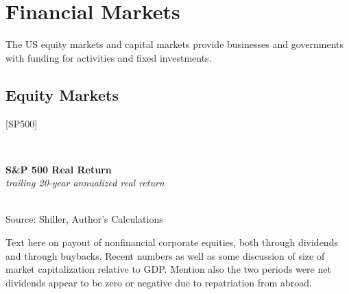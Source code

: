 \documentclass{report}
\makeatletter
\newcommand{\tbllink}[1]{\href{https://raw.githubusercontent.com/bdecon/US-chartbook/master/chartbook/data/#1}{\faTable}}
\newcommand*\short[1]{\expandafter\@gobbletwo\number\numexpr#1\relax}
\newcommand{\dateaxisticks}{
		date coordinates in=x, axis line style={draw=none},
		xmax={2020-02-01},
		max space between ticks=40,	    
		xtick={{1990-01-01}, {1992-01-01}, {1994-01-01}, 
			{1996-01-01}, {1998-01-01}, {2000-01-01}, 
			{2002-01-01}, {2004-01-01}, {2006-01-01},
			{2008-01-01}, {2010-01-01}, {2012-01-01}, {2014-01-01},
		    {2016-01-01}, {2018-01-01}, {2020-01-01}},
		minor xtick={{1989-01-01}, {1991-01-01}, {1993-01-01},
			{1995-01-01}, {1997-01-01}, {1999-01-01}, 
			{2001-01-01}, {2003-01-01}, {2005-01-01}, {2007-01-01},
		    {2009-01-01}, {2011-01-01}, {2013-01-01}, {2015-01-01},
		    {2017-01-01}, {2019-01-01}},
		enlarge y limits={0.06}, enlarge x limits={0.01},
		}
\newcommand{\bbar}[2]{extra #1 ticks = {{#2}}, extra #1 tick labels = ,
		extra #1 tick style = {grid=major, grid style={thick, black!25}},}
\newcommand{\thickline}[4]{\addplot[ultra thick, no markers, color=#1] 
		table [x=#2, y=#3, col sep=comma] {#4};	}
\newcommand{\rbars}{
		\fill[color=black!10] (axis cs:{1990-07-01},\pgfkeysvalueof{/pgfplots/ymin}) rectangle 
			(axis cs:{1991-03-01}, \pgfkeysvalueof{/pgfplots/ymax});
		\fill[color=black!10] (axis cs:{2007-12-01},\pgfkeysvalueof{/pgfplots/ymin}) rectangle 
			(axis cs:{2009-07-01}, \pgfkeysvalueof{/pgfplots/ymax});
		\fill[color=black!10] (axis cs:{2001-03-01},\pgfkeysvalueof{/pgfplots/ymin}) rectangle 
			(axis cs:{2001-11-01}, \pgfkeysvalueof{/pgfplots/ymax});}
\makeatother
\begin{document}
{{{{\begin{minipage}{0.76\textwidth}
\end{minipage}

\newpage

\begin{minipage}{0.76\textwidth}
\section*{\color{darkgray}\LARGE \seriffont Financial Markets}
\label{sec:cap}
\small The US equity markets and capital markets provide businesses and governments with funding for activities and fixed investments. \\

\vspace{2mm}



\subsection*{\color{black!70} \seriffont Equity Markets}

\hspace{4mm} [SP500] \\

\vspace{5mm}

\small   \\

\vspace{2mm}

\noindent \normalsize \textbf{S\&P 500 Real Return}\\
\footnotesize{\textit{trailing 20-year annualized real return}}\\ 
\noindent \hspace*{-2mm} \\
\footnotesize{Source: Shiller, Author's Calculations} \hfill \tbllink{sp500rr.csv}\\

\vspace{3mm}

\small Text here on payout of nonfinancial corporate equities, both through dividends and through buybacks. Recent numbers as well as some discussion of size of market capitalization relative to GDP. Mention also the two periods were net dividends appear to be zero or negative due to repatriation from abroad. \\


\end{minipage}}}}}
\end{document}
